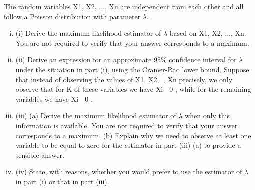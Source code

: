 \documentclass[a4paper,12pt]{article}
\begin{document}
\item The random variables X1, X2, ..., Xn are independent from each other and all follow a
Poisson distribution with parameter $\lambda$.

\begin{enumerate}[(i)]
\item (i) Derive the maximum likelihood estimator of $\lambda$ based on X1, X2, ..., Xn. You are not required to verify that your answer corresponds to a maximum. 
\item (ii) Derive an expression for an approximate 95\% confidence interval for $\lambda$ under the situation in part (i), using the Cramer-Rao lower bound. 
Suppose that instead of observing the values of X1, X2, , Xn precisely, we only observe that for K of these variables we have Xi  0 , while for the remaining variables we have Xi  0 .
\item (iii) (a) Derive the maximum likelihood estimator of $\lambda$ when only this information is available. You are not required to verify that your
answer corresponds to a maximum. 
(b) Explain why we need to observe at least one variable to be equal to zero for the estimator in part (iii) (a) to provide a sensible answer. 
\item (iv) State, with reasons, whether you would prefer to use the estimator of $\lambda$ in part
(i) or that in part (iii). 
\end{enumerate}
\end{document}
